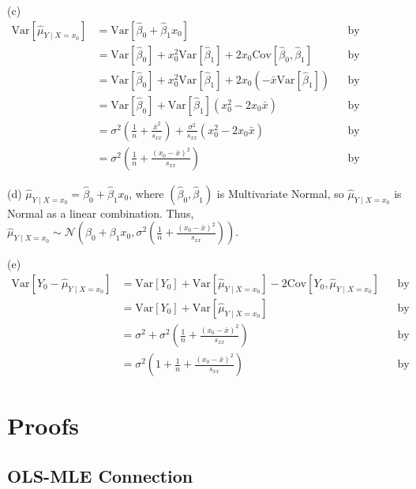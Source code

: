 \documentclass[12pt,oneside]{article}
\newcommand{\Var}{\text{Var}}
\newcommand{\Cov}{\text{Cov}}
\newcommand{\N}{\mathcal{N}}
\theoremstyle{definition}
\theoremstyle{remark}
\begin{document}
\begin{solutionbox}
{(c)
\[
\begin{aligned}
\Var[\hat{\mu}_{Y \mid X = x_0}] &= \Var[\hat{\beta}_0 + \hat{\beta}_1 x_0] && \text{by substituting} \\
&= \Var[\hat{\beta}_0] + x_0^2 \Var[\hat{\beta}_1] + 2 x_0 \Cov[\hat{\beta}_0, \hat{\beta}_1] && \text{by bilinearity} \\
&= \Var[\hat{\beta}_0] + x_0^2 \Var[\hat{\beta}_1] + 2 x_0 (- \bar{x} \Var[\hat{\beta}_{1}]) && \text{by substituting} \\
&= \Var[\hat{\beta}_0] + \Var[\hat{\beta}_1] (x_0^2 - 2 x_0 \bar{x}) && \text{by simplifying} \\
&= \sigma^2 \left( \frac{1}{n} + \frac{\bar{x}^2}{s_{xx}} \right) + \frac{\sigma^2}{s_{xx}} (x_0^2 - 2 x_0 \bar{x}) && \text{by substituting} \\
&= \sigma^2 \left( \frac{1}{n} + \frac{(x_0 - \bar{x})^2}{s_{xx}} \right) && \text{by simplifying}
\end{aligned}
\]

(d) $\hat{\mu}_{Y \mid X = x_0} = \hat{\beta}_0 + \hat{\beta}_1 x_0$, where $(\hat{\beta}_0, \hat{\beta}_1)$ is Multivariate Normal, so $\hat{\mu}_{Y \mid X = x_0}$ is Normal as a linear combination. Thus, $\hat{\mu}_{Y \mid X = x_0} \sim \N \left( \beta_0 + \beta_1 x_0, \sigma^2 \left( \frac{1}{n} + \frac{(x_0 - \bar{x})^2}{s_{xx}} \right) \right)$.

(e)
\[
\begin{aligned}
\Var[Y_0 - \hat{\mu}_{Y \mid X = x_0}] &= \Var[Y_0] + \Var[\hat{\mu}_{Y \mid X = x_0}] - 2 \Cov[Y_0, \hat{\mu}_{Y \mid X = x_0}] && \text{by bilinearity} \\
&= \Var[Y_0] + \Var[\hat{\mu}_{Y \mid X = x_0}] && \text{by independence} \\
&= \sigma^2 + \sigma^2 \left( \frac{1}{n} + \frac{(x_0 - \bar{x})^2}{s_{xx}} \right) && \text{by substituting} \\
&= \sigma^2 \left(1 + \frac{1}{n} + \frac{(x_0 - \bar{x})^2}{s_{xx}} \right) && \text{by substituting}
\end{aligned}
\]
}
\end{solutionbox}

\appendix
\section{Proofs}

\subsection{OLS-MLE Connection}
\label{app:ols-mle}
\end{document}
